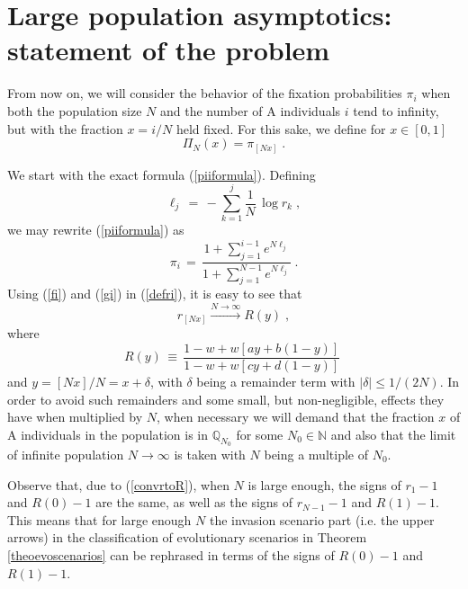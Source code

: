 \documentclass[12pt]{article}
\begin{document}
\section{Large population asymptotics: statement of the problem}
\label{secasymptotics}
From now on, we will consider the behavior of the fixation probabilities $\pi_i$ when both the population size $N$ and the number of A individuals $i$ tend to infinity, but with the fraction $x=i/N$ held fixed. For this sake, we define for $x \in[0,1]$
\begin{equation}  \label{defPiN}
\Pi_N(x)= \pi_{[Nx]}\;.
\end{equation}

We start with
 the exact formula (\ref{piiformula}). Defining 
\begin{equation}
\label{discpotential}
\ell_j \,=\, - \sum_{k=1}^j \frac{1}{N}\, \log r_k \;,
\end{equation}
we may rewrite (\ref{piiformula}) as
\begin{equation}
\label{piiell}
\pi_i \,=\, \frac{1+ \sum_{j=1}^{i-1} e^{ N \ell_j}}{1+ \sum_{j=1}^{N-1} e^{ N \ell_j}} \;.
\end{equation}
Using (\ref{fi}) and (\ref{gi}) in (\ref{defri}), it is easy to see that
\begin{equation}
\label{convrtoR}
r_{[Nx]} \stackrel{N \rightarrow \infty}{\longrightarrow}  R(y) \;,
\end{equation}
where
\begin{equation}
\label{defR}
R(y) \,\equiv \, \frac{1-w+w[ay+b(1-y)]}{1-w+w[cy+d(1-y)]}\;
\end{equation}
and  $y=[Nx]/N=x+\delta$, with $\delta$ being a remainder term with $|\delta|\le 1/(2N)$. In order to avoid such remainders and some small, but non-negligible, effects they have when multiplied by $N$, when necessary we will demand that the fraction $x$ of A individuals in the population is in $\mathbb{Q}_{N_0}$ for some $N_0 \in \mathbb{N}$ and also that the limit of infinite population $N \rightarrow \infty$ is taken with $N$ being a multiple of $N_0$.

Observe that, due to (\ref{convrtoR}), when $N$ is large enough, the signs of $r_1-1$ and $R(0)-1$ are the same, as well as the signs of $r_{N-1}-1$ and $R(1)-1$. This means that for large enough $N$ the invasion scenario part (i.e. the upper arrows) in the classification of evolutionary scenarios in Theorem \ref{theoevoscenarios} can be rephrased in terms of the signs of $R(0)-1$ and $R(1)-1$.
\end{document}

